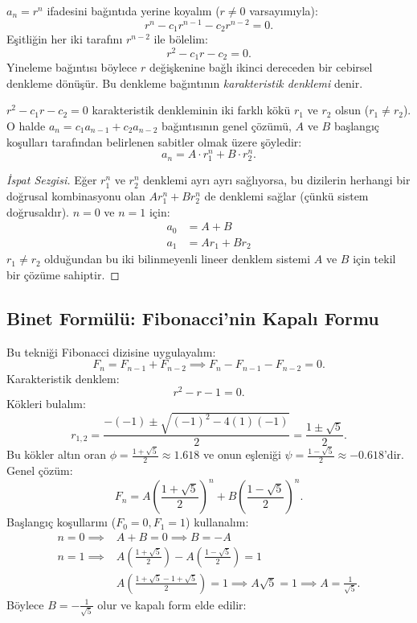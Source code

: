 $a_n = r^n$ ifadesini bağıntıda yerine koyalım ($r \ne 0$ varsayımıyla):
\[
r^n - c_1 r^{n-1} - c_2 r^{n-2} = 0.
\]
Eşitliğin her iki tarafını $r^{n-2}$ ile bölelim:
\[
r^2 - c_1 r - c_2 = 0.
\]
Yineleme bağıntısı böylece $r$ değişkenine bağlı ikinci dereceden bir cebirsel denkleme dönüşür. Bu denkleme bağıntının \emph{karakteristik denklemi} denir.

\begin{theorem}
$r^2 - c_1 r - c_2 = 0$ karakteristik denkleminin iki farklı kökü $r_1$ ve $r_2$ olsun ($r_1 \ne r_2$). O halde $a_n = c_1 a_{n-1} + c_2 a_{n-2}$ bağıntısının genel çözümü, $A$ ve $B$ başlangıç koşulları tarafından belirlenen sabitler olmak üzere şöyledir:
\[
a_n = A \cdot r_1^n + B \cdot r_2^n.
\]
\end{theorem}

\begin{proof}[İspat Sezgisi]
Eğer $r_1^n$ ve $r_2^n$ denklemi ayrı ayrı sağlıyorsa, bu dizilerin herhangi bir doğrusal kombinasyonu olan $A r_1^n + B r_2^n$ de denklemi sağlar (çünkü sistem doğrusaldır). $n=0$ ve $n=1$ için:
\begin{align*}
a_0 &= A + B \\
a_1 &= A r_1 + B r_2
\end{align*}
$r_1 \ne r_2$ olduğundan bu iki bilinmeyenli lineer denklem sistemi $A$ ve $B$ için tekil bir çözüme sahiptir.
\end{proof}

\subsection{Binet Formülü: Fibonacci'nin Kapalı Formu}

Bu tekniği Fibonacci dizisine uygulayalım:
\[
F_n = F_{n-1} + F_{n-2} \implies F_n - F_{n-1} - F_{n-2} = 0.
\]
Karakteristik denklem:
\[
r^2 - r - 1 = 0.
\]
Kökleri bulalım:
\[
r_{1,2} = \frac{-(-1) \pm \sqrt{(-1)^2 - 4(1)(-1)}}{2} = \frac{1 \pm \sqrt{5}}{2}.
\]
Bu kökler altın oran $\phi = \frac{1+\sqrt{5}}{2} \approx 1.618$ ve onun eşleniği $\psi = \frac{1-\sqrt{5}}{2} \approx -0.618$'dir.
Genel çözüm:
\[
F_n = A \left(\frac{1+\sqrt{5}}{2}\right)^n + B \left(\frac{1-\sqrt{5}}{2}\right)^n.
\]
Başlangıç koşullarını ($F_0 = 0, F_1 = 1$) kullanalım:
\begin{align*}
n=0 \implies & A + B = 0 \implies B = -A \\
n=1 \implies & A \left(\frac{1+\sqrt{5}}{2}\right) - A \left(\frac{1-\sqrt{5}}{2}\right) = 1 \\
& A \left( \frac{1+\sqrt{5} - 1 + \sqrt{5}}{2} \right) = 1 \implies A \sqrt{5} = 1 \implies A = \frac{1}{\sqrt{5}}.
\end{align*}
Böylece $B = -\frac{1}{\sqrt{5}}$ olur ve kapalı form elde edilir:

